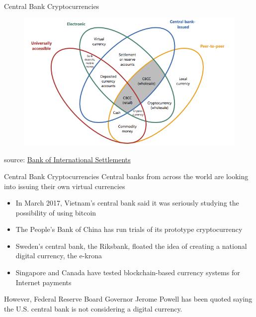 \documentclass[9pt]{beamer}
\begin{document}


\begin{frame}{Central Bank Cryptocurrencies}
	\begin{figure}[]
		\centering
		\includegraphics  [width=4.in]{Images/taxonomy}
	\end{figure}
	\begin{scriptsize}
		source: \href{https://www.bis.org/publ/qtrpdf/r_qt1709f.pdf}{Bank of International Settlements}
	\end{scriptsize}
\end{frame}


\begin{frame}{Central Bank Cryptocurrencies}
	Central banks from across the world are looking into issuing their own virtual currencies
	\begin{itemize}
		\item In March 2017, Vietnam's central bank said it was seriously studying the possibility of using bitcoin
		\item The People's Bank of China has run trials of its prototype cryptocurrency
		\item Sweden's central bank, the Riksbank, floated the idea of creating a national digital currency, the e-krona
		\item Singapore and Canada have tested blockchain-based currency systems for Internet payments
	\end{itemize}
	However, Federal Reserve Board Governor Jerome Powell has been quoted saying the U.S. central bank is not considering a digital currency.
\end{frame}

\end{document}
